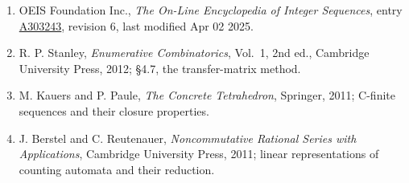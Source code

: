 \documentclass[11pt]{article}
\theoremstyle{definition}
\begin{document}
\begin{enumerate}

\item OEIS Foundation Inc., \emph{The On-Line Encyclopedia of Integer Sequences}, entry \href{https://oeis.org/A303243}{A303243}, revision 6, last modified Apr 02 2025.

\item R. P. Stanley, \emph{Enumerative Combinatorics}, Vol.~1, 2nd ed., Cambridge University Press, 2012; \S4.7, the transfer-matrix method.

\item M. Kauers and P. Paule, \emph{The Concrete Tetrahedron}, Springer, 2011; C-finite sequences and their closure properties.

\item J. Berstel and C. Reutenauer, \emph{Noncommutative Rational Series with Applications}, Cambridge University Press, 2011; linear representations of counting automata and their reduction.

\end{enumerate}
\end{document}

